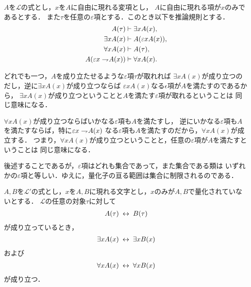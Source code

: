 	\begin{screen}
		\begin{logicalaxm}[量化記号に関する規則]\label{logicalaxm:rules_of_quantifiers}
			$A$を$\mathcal{L}$の式とし，$x$を$A$に自由に現れる変項とし，
			$A$に自由に現れる項が$x$のみであるとする．
			また$\tau$を任意の$\varepsilon$項とする．このとき以下を推論規則とする．
			\begin{align}
				A(\tau) &\vdash \exists x A(x), \\
				\exists x A(x) &\vdash A(\varepsilon x A(x)), \\
				\forall x A(x) &\vdash A(\tau), \\
				A(\varepsilon x \rightharpoondown\hspace{-0.25em} A(x)) &\vdash \forall x A(x).
			\end{align}
		\end{logicalaxm}
	\end{screen}
	
	どれでも一つ，$A$を成り立たせるような$\varepsilon$項$\tau$が取れれば
	$\exists x A(x)$が成り立つのだし，逆に$\exists x A(x)$が成り立つならば
	$\varepsilon x A(x)$なる$\epsilon$項が$A$を満たすのであるから，
	$\exists x A(x)$が成り立つということと$A$を満たす$\varepsilon$項が取れるということは
	同じ意味になる．
	
	$\forall x A(x)$が成り立つならばいかなる$\varepsilon$項も$A$を満たすし，
	逆にいかなる$\varepsilon$項も$A$を満たすならば，特に$\varepsilon x \rightharpoondown\hspace{-0.25em} A(x)$
	なる$\varepsilon$項も$A$を満たすのだから，$\forall x A(x)$が成立する．
	つまり，$\forall x A(x)$が成り立つということと，任意の$\varepsilon$項が$A$を満たすということは
	同じ意味になる．
	
	後述することであるが，$\varepsilon$項はどれも集合であって，また集合である類は
	いずれかの$\varepsilon$項と等しい．ゆえに，量化子の亘る範囲は集合に制限されるのである．
	
	\begin{screen}
		\begin{logicalthm}[量化記号の性質(イ)]\label{logicalthm:properties_of_quantifiers}
			$A,B$を$\mathcal{L}'$の式とし，$x$を$A,B$に現れる文字とし，$x$のみが$A,B$で量化されていないとする．
			$\mathcal{L}$の任意の対象$\tau$に対して
			\begin{align}
				A(\tau) \hspace{0.25em}\leftrightarrow\hspace{0.25em} B(\tau)
			\end{align}
			が成り立っているとき，
			\begin{align}
				\exists x A(x) \hspace{0.25em}\leftrightarrow\hspace{0.25em} \exists x B(x)
			\end{align}
			および
			\begin{align}
				\forall x A(x) \hspace{0.25em}\leftrightarrow\hspace{0.25em} \forall x B(x)
			\end{align}
			が成り立つ．
		\end{logicalthm}
	\end{screen}
	
